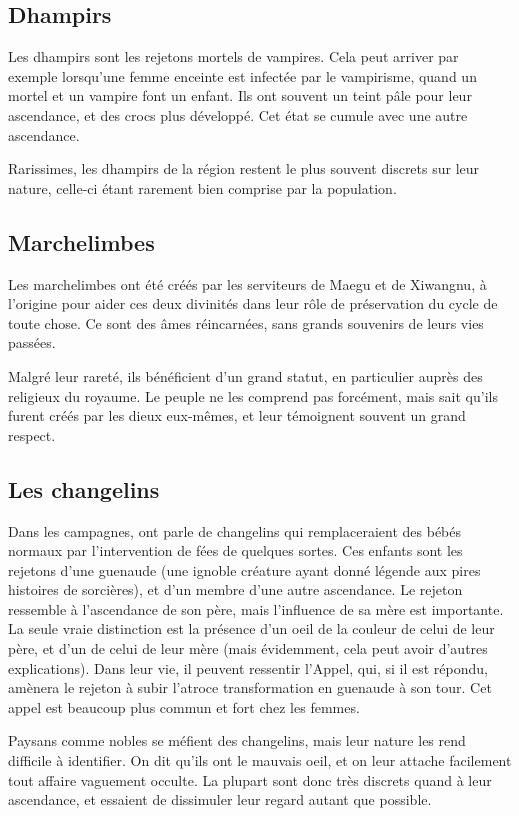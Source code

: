 \documentclass[10pt,a4paper]{book}
\begin{document}
\subsection{Dhampirs}
Les dhampirs sont les rejetons mortels de vampires. Cela peut arriver par exemple lorsqu'une femme enceinte est infectée par le vampirisme, quand un mortel et un vampire font un enfant. Ils ont souvent un teint pâle pour leur ascendance, et des crocs plus développé. Cet état se cumule avec une autre ascendance.

Rarissimes, les dhampirs de la région restent le plus souvent discrets sur leur nature, celle-ci étant rarement bien comprise par la population.
\subsection{Marchelimbes}
Les marchelimbes ont été créés par les serviteurs de Maegu et de Xiwangnu, à l'origine pour aider ces deux divinités dans leur rôle de préservation du cycle de toute chose. Ce sont des âmes réincarnées, sans grands souvenirs de leurs vies passées.

Malgré leur rareté, ils bénéficient d'un grand statut, en particulier auprès des religieux du royaume. Le peuple ne les comprend pas forcément, mais sait qu'ils furent créés par les dieux eux-mêmes, et leur témoignent souvent un grand respect.
\subsection{Les changelins}
Dans les campagnes, ont parle de changelins qui remplaceraient des bébés normaux par l'intervention de fées de quelques sortes. Ces enfants sont les rejetons d'une guenaude (une ignoble créature ayant donné légende aux pires histoires de sorcières), et d'un membre d'une autre ascendance. Le rejeton ressemble à l'ascendance de son père, mais l'influence de sa mère est importante. La seule vraie distinction est la présence d'un oeil de la couleur de celui de leur père, et d'un de celui de leur mère (mais évidemment, cela peut avoir d'autres explications). Dans leur vie, il peuvent ressentir l'Appel, qui, si il est répondu, amènera le rejeton à subir l'atroce transformation en guenaude à son tour. Cet appel est beaucoup plus commun et fort chez les femmes.

Paysans comme nobles se méfient des changelins, mais leur nature les rend difficile à identifier. On dit qu'ils ont le mauvais oeil, et on leur attache facilement tout affaire vaguement occulte. La plupart sont donc très discrets quand à leur ascendance, et essaient de dissimuler leur regard autant que possible.
\end{document}

